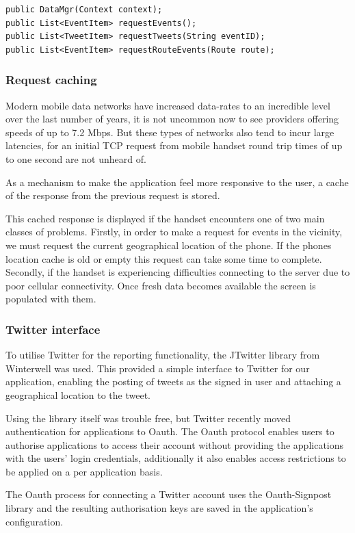 \begin{lstlisting}
public DataMgr(Context context);
public List<EventItem> requestEvents();
public List<TweetItem> requestTweets(String eventID);
public List<EventItem> requestRouteEvents(Route route);
\end{lstlisting}

\subsubsection{Request caching}
Modern mobile data networks have increased data-rates to an incredible level
over the last number of years, it is not uncommon now to see providers offering
speeds of up to 7.2 Mbps. But these types of networks also tend to incur large
latencies, for an initial TCP request from mobile handset round trip times of
up to one second are not unheard of.

As a mechanism to make the application feel more responsive to the user, a
cache of the response from the previous request is stored.

This cached response is displayed if the handset encounters one of two main
classes of problems. Firstly, in order to make a request for events in the
vicinity, we must request the current geographical location of the phone. If
the phones location cache is old or empty this request can take some time to
complete. Secondly, if the handset is experiencing difficulties connecting to
the server due to poor cellular connectivity. Once fresh data becomes available
the screen is populated with them. 

\subsubsection{Twitter interface}
To utilise Twitter for the reporting functionality, the JTwitter library from
Winterwell was used. This provided a simple interface to Twitter for our
application, enabling the posting of tweets as the signed in user and attaching
a geographical location to the tweet.

Using the library itself was trouble free, but Twitter recently moved
authentication for applications to Oauth. The Oauth protocol enables users to
authorise applications to access their account without providing the
applications with the users' login credentials, additionally it also enables
access restrictions to be applied on a per application basis.

The Oauth process for connecting a Twitter account uses the Oauth-Signpost
library and the resulting authorisation keys are saved in the application's
configuration. 

